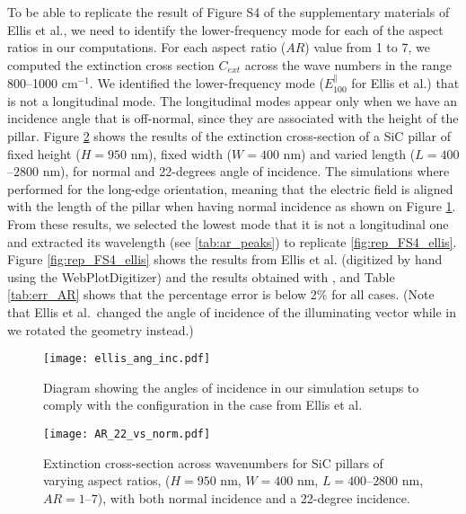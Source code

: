 To be able to replicate the result of Figure S4 of the supplementary materials of Ellis et al., we
need to identify the lower-frequency mode for each of
the aspect ratios in our computations. For each aspect ratio ($AR$) 
value from 1 to 7, we computed the extinction cross section $C_{ext}$ across the wave numbers in the range
800--1000 cm$^{-1}$. We identified the lower-frequency mode ($E^{\parallel}_{100}$ for Ellis et al.) that is not a 
longitudinal mode. The longitudinal modes appear only when we have an incidence angle that is off-normal, since 
they are associated with the height of the pillar. Figure \ref{fig:AR_22_vs_norm} shows the results of the extinction 
cross-section of a SiC pillar of fixed height ($H=950$ nm), fixed width ($W=400$ nm) and varied length ($L=400$--$2800$ nm), for normal 
and 22-degrees angle of incidence. The simulations where performed 
for the long-edge orientation, meaning that the electric field is aligned with the length of the pillar 
when having normal incidence as shown on Figure \ref{fig:ellis_ang_inc}. From these results, we selected 
the lowest mode that it is not a longitudinal one and extracted its wavelength (see \ref{tab:ar_peaks}) to replicate 
\ref{fig:rep_FS4_ellis}. Figure \ref{fig:rep_FS4_ellis} shows the results from  Ellis et al. (digitized by hand using the WebPlotDigitizer) and the results obtained
with \pygbe, and Table \ref{tab:err_AR} shows that the percentage error is below 2$\%$ for all cases.
(Note that Ellis et al.\ changed the angle of incidence of the illuminating vector while in \pygbe we 
rotated the geometry instead.) 

\begin{figure}
    \centering
    \texttt{[image: ellis\_ang\_inc.pdf]} 
    \caption{Diagram showing the angles of incidence in our simulation setups to comply with the configuration in the case from Ellis et al.}
    \label{fig:ellis_ang_inc}
 \end{figure}


\begin{figure}
    \centering
    \texttt{[image: AR\_22\_vs\_norm.pdf]} 
    \caption{Extinction cross-section across wavenumbers for SiC pillars of varying aspect ratios,  
             ($H=950$ nm, $W=400$ nm, $L=400$--$2800$ nm, $AR=1$--$7$), with both normal incidence and a 
             22-degree incidence.
            }
    \label{fig:AR_22_vs_norm}
 \end{figure}


